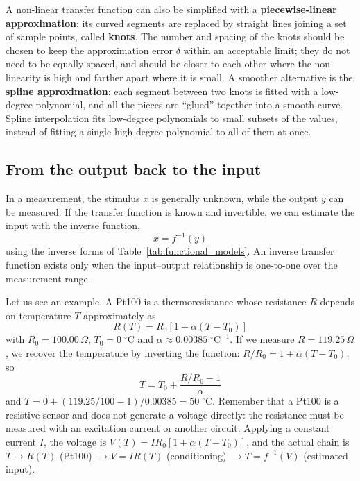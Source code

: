 \documentclass[letterpaper,11pt,leqno]{book}
\begin{document}
A non-linear transfer function can also be simplified with a \textbf{piecewise-linear approximation}: its curved segments are replaced by straight lines joining a set of sample points, called \textbf{knots}. The number and spacing of the knots should be chosen to keep the approximation error $\delta$ within an acceptable limit; they do not need to be equally spaced, and should be closer to each other where the non-linearity is high and farther apart where it is small. A smoother alternative is the \textbf{spline approximation}: each segment between two knots is fitted with a low-degree polynomial, and all the pieces are ``glued'' together into a smooth curve. Spline interpolation fits low-degree polynomials to small subsets of the values, instead of fitting a single high-degree polynomial to all of them at once.

\subsection{From the output back to the input}

In a measurement, the stimulus $x$ is generally unknown, while the output $y$ can be measured. If the transfer function is known and invertible, we can estimate the input with the inverse function,
\begin{equation}
\boxed{x = f^{-1}(y)}
\label{eq:inverse_transfer_function}
\end{equation}
using the inverse forms of Table~\ref{tab:functional_models}. An inverse transfer function exists only when the input--output relationship is one-to-one over the measurement range.

Let us see an example. A Pt100 is a thermoresistance whose resistance $R$ depends on temperature $T$ approximately as
\begin{equation}
\boxed{R(T) = R_0\left[1 + \alpha(T - T_0)\right]}
\label{eq:pt100_linear_model}
\end{equation}
with $R_0 = 100.00\,\Omega$, $T_0 = 0\;^\circ\text{C}$ and $\alpha \approx 0.00385\;^\circ\text{C}^{-1}$. If we measure $R = 119.25\,\Omega$, we recover the temperature by inverting the function: $R/R_0 = 1 + \alpha(T - T_0)$, so
\begin{equation}
\boxed{T = T_0 + \frac{R/R_0 - 1}{\alpha}}
\label{eq:pt100_inversion}
\end{equation}
and $T = 0 + (119.25/100 - 1)/0.00385 = 50\;^\circ\text{C}$. Remember that a Pt100 is a resistive sensor and does not generate a voltage directly: the resistance must be measured with an excitation current or another circuit. Applying a constant current $I$, the voltage is $V(T) = IR_0[1 + \alpha(T - T_0)]$, and the actual chain is $T \to R(T)$ (Pt100) $\to V = IR(T)$ (conditioning) $\to T = f^{-1}(V)$ (estimated input).
\end{document}
